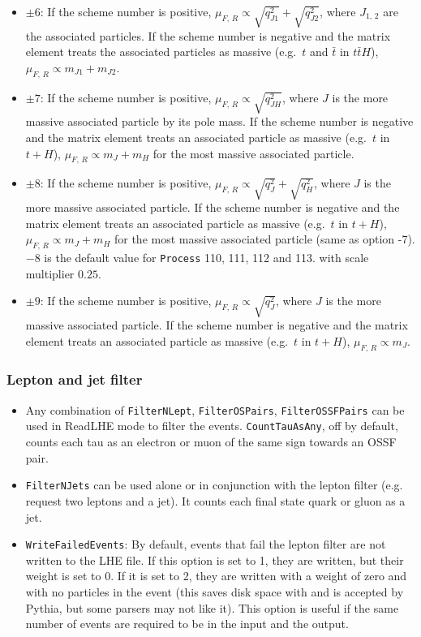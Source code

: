\documentclass[aps,superscriptaddress,nofootinbib]{revtex4}
\newcommand{\eg}{e.g.~}
\begin{document}
\begin{itemize}
\begin{itemize}
		\item $\pm6$: If the scheme number is positive, $\mu_{F,\,R} \propto \sqrt{q^2_{J1}}+\sqrt{q^2_{J2}}$, where $J_{1,\,2}$ are the associated particles. If the scheme number is negative and the matrix element treats the associated particles as massive (\eg $t$ and $\bar{t}$ in $t\bar{t}H$), $\mu_{F,\,R} \propto m_{J1}+m_{J2}$.
		\item $\pm7$: If the scheme number is positive, $\mu_{F,\,R} \propto \sqrt{q^2_{JH}}$, where $J$ is the more massive associated particle by its pole mass. If the scheme number is negative and the matrix element treats an associated particle as massive (\eg $t$ in $t+H$), $\mu_{F,\,R} \propto m_{J}+m_{H}$ for the most massive associated particle.
		\item $\pm8$: If the scheme number is positive, $\mu_{F,\,R} \propto \sqrt{q^2_{J}}+\sqrt{q^2_{H}}$, where $J$ is the more massive associated particle. If the scheme number is negative and the matrix element treats an associated particle as massive (\eg $t$ in $t+H$), $\mu_{F,\,R} \propto m_{J}+m_{H}$ for the most massive associated particle (same as option -7).  $-8$ is the default value for \verb|Process| 110, 111, 112 and 113. with scale multiplier $0.25$.
		\item $\pm9$: If the scheme number is positive, $\mu_{F,\,R} \propto \sqrt{q^2_{J}}$, where $J$ is the more massive associated particle. If the scheme number is negative and the matrix element treats an associated particle as massive (\eg $t$ in $t+H$), $\mu_{F,\,R} \propto m_{J}$.
	\end{itemize}
\end{itemize}
\subsubsection{Lepton and jet filter}
\begin{itemize}
\item Any combination of \verb|FilterNLept|, \verb|FilterOSPairs|, \verb|FilterOSSFPairs| can be used in ReadLHE mode to filter the events.  \verb|CountTauAsAny|, off by default, counts each tau as an electron or muon of the same sign towards an OSSF pair.
\item \verb|FilterNJets| can be used alone or in conjunction with the lepton filter (e.g. request two leptons and a jet).  It counts each final state quark or gluon as a jet.
\item \verb|WriteFailedEvents|: By default, events that fail the lepton filter are not written to the LHE file.  If this option is set to 1, they are written, but their weight is set to 0.  If it is set to 2, they are written with a weight of zero and with no particles in the event (this saves disk space with  and is accepted by Pythia, but some parsers may not like it).  This option is useful if the same number of events are required to be in the input and the output.
\end{itemize}
\end{document}
